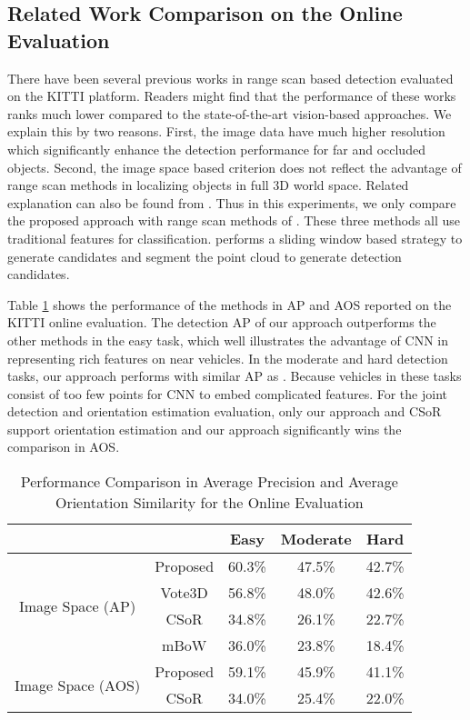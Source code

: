 \documentclass[conference]{IEEEtran}
\begin{document}
\subsection{Related Work Comparison on the Online Evaluation}
\label{sec:online}
There have been several previous works in range scan based detection evaluated on the KITTI platform. Readers might find that the performance of these works ranks much lower compared to the state-of-the-art vision-based approaches. We explain this by two reasons. First, the image data have much higher resolution which significantly enhance the detection performance for far and occluded objects. Second, the image space based criterion does not reflect the advantage of range scan methods in localizing objects in full 3D world space.  Related explanation can also be found from \citet{Wang}. Thus in this experiments, we only compare the proposed approach with range scan methods of \citet{Wang, Behley2013a, thesisSTUDIENARBEITPlotkin}. These three methods all use traditional features for classification. \citet{Wang} performs a sliding window based strategy to generate candidates and \citet{Behley2013a, thesisSTUDIENARBEITPlotkin} segment the point cloud to generate detection candidates.

Table \ref{tab:online} shows the performance of the methods in AP and AOS reported on the KITTI online evaluation. The detection AP of our approach outperforms the other methods in the easy task, which well illustrates the advantage of CNN in representing rich features on near vehicles. In the moderate and hard detection tasks, our approach performs with similar AP as \citet{Wang}. Because vehicles in these tasks consist of too few points for CNN to embed complicated features. For the joint detection and orientation estimation evaluation, only our approach and CSoR support orientation estimation and our approach significantly wins the comparison in AOS.

\begin{table}
    \centering
    \caption{Performance Comparison in Average Precision and Average Orientation Similarity for the Online Evaluation}
    \begin{tabular}{ccccc}
    \hline\hline
    & & Easy & Moderate & Hard \\
    \hline
    \multirow{4}{*}{Image Space (AP)} & Proposed & 60.3\% & 47.5\% & 42.7\% \\
    & Vote3D & 56.8\% & 48.0\% & 42.6\%\\
    & CSoR & 34.8\% & 26.1\% & 22.7\% \\
    & mBoW & 36.0\% & 23.8\% & 18.4\% \\
    \hline
    \multirow{2}{*}{Image Space (AOS)} & Proposed & 59.1\% & 45.9\% & 41.1\% \\
    & CSoR & 34.0\% & 25.4\% & 22.0\% \\
    \hline

    \end{tabular}
    \label{tab:online}
\end{table}
\end{document}
